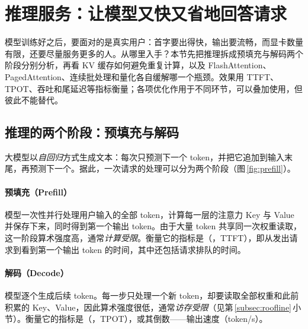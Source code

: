 \section{推理服务：让模型又快又省地回答请求}
\label{sec:infer}

\begin{guide}
\begin{minipage}[c]{0.66\linewidth}
\noindent 模型训练好之后，要面对的是真实用户：首字要出得快，输出要流畅，而显卡数量有限，还要尽量服务更多的人。从哪里入手？本节先把推理拆成预填充与解码两个阶段分别分析，再看 KV 缓存如何避免重复计算，以及 FlashAttention、PagedAttention、连续批处理和量化各自缓解哪一个瓶颈。效果用 TTFT、TPOT、吞吐和尾延迟等指标衡量；各项优化作用于不同环节，可以叠加使用，但彼此不能替代。
\end{minipage}\hfill
\begin{minipage}[c]{0.3\linewidth}\centering{}\end{minipage}
\end{guide}

\subsection{推理的两个阶段：预填充与解码}
\label{subsec:prefill-decode}

大模型以\emph{自回归}方式生成文本：每次只预测下一个 token，并把它追加到输入末尾，再预测下一个。据此，一次请求的处理可以分为两个阶段（图\,\ref{fig:prefill}）。

\paragraph{预填充（Prefill）} 模型一次性并行处理用户输入的全部 token，计算每一层的注意力 Key 与 Value 并保存下来，同时得到第一个输出 token。由于大量 token 共享同一次权重读取，这一阶段算术强度高，通常\emph{计算受限}。衡量它的指标是（，TTFT），即从发出请求到看到第一个输出 token 的时间，其中还包括请求排队的时间。

\paragraph{解码（Decode）} 模型逐个生成后续 token。每一步只处理一个新 token，却要读取全部权重和此前积累的 Key、Value，因此算术强度很低，通常\emph{访存受限}（见第\,\ref{subsec:roofline}\,小节）。衡量它的指标是（，TPOT），或其倒数——输出速度（token/s）。

